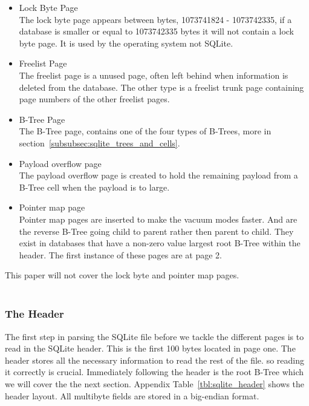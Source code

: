 \begin{itemize} 
	\item Lock Byte Page \hfill \\
		The lock byte page appears between bytes, 1073741824 - 1073742335, if a database is smaller or equal to 1073742335 bytes it will not contain a lock byte page. It is used by the operating system not SQLite.
	
	\item Freelist Page \hfill \\
		The freelist page is a unused page, often left behind when information is deleted from the database. The other type is a freelist trunk page containing page numbers of the other freelist pages.
	
	\item B-Tree Page \hfill \\
		The B-Tree page, contains one of the four types of B-Trees, more in section~\ref{subsubsec:sqlite_trees_and_cells}.
	
	\item Payload overflow page \hfill \\
		The payload overflow page is created to hold the remaining payload from a B-Tree cell when the payload is to large.
	
	\item Pointer map page \hfill \\
		Pointer map pages are inserted to make the vacuum modes faster. And are the reverse B-Tree going child to parent rather then parent to child. They exist in databases that have a non-zero value largest root B-Tree within the header. The first instance of these pages are at page 2. 
\end{itemize} 

This paper will not cover the lock byte and pointer map pages. 
\\\\
\subsubsection{The Header}
\label{subsubsec:sqlite_page_hader}

The first step in parsing the SQLite file before we tackle the different pages is to read in the SQLite header. This is the first 100 bytes located in page one. The header stores all the necessary information to read the rest of the file. so reading it correctly is crucial. Immediately following the header is the root B-Tree which we will cover the the next section. Appendix Table~\ref{tbl:sqlite_header} shows the header layout.  All multibyte fields are stored in a big-endian format.


